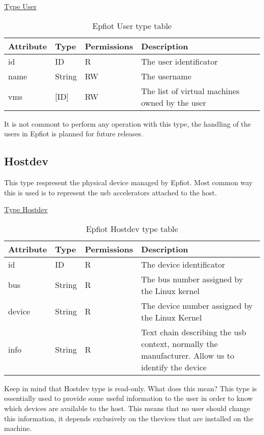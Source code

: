\underline{Type User}
\begin{table}[H]
\begin{center}
\begin{tabular}[b]{|l|l|l|l|}
    \hline
    Attribute & Type & Permissions & Description \\
    \hline
    id & ID & R & The user identificator \\
    name & String & RW & The username\\
    vms & [ID] & RW & The list of virtual machines owned by the user\\
    \hline
\end{tabular}
\caption{Epfiot User type table}
\label{table1}
\end{center}
\end{table}

It is not commont to perform any operation with this type, the handling of the users in Epfiot is planned for future releases.

\subsection{Hostdev}
\label{makereference5.1.2}

This type respresent the physical device managed by Epfiot. Most common way this is used is to represent the usb accelerators attached to the host.

\underline{Type Hostdev}
\begin{table}[H]
\begin{center}
\begin{tabular}[b]{|l|l|l|p{11cm}|}
    \hline
    Attribute & Type & Permissions & Description \\
    \hline
    id & ID & R & The device identificator \\
    \hline
    bus & String & R & The bus number assigned by the Linux kernel\\
    \hline
    device & String & R & The device number assigned by the Linux Kernel\\
    \hline
    info & String & R & Text chain describing the usb context, normally the manufacturer. Allow us to identify the device\\
    \hline
\end{tabular}
\caption{Epfiot Hostdev type table}
\label{table1}
\end{center}
\end{table}

Keep in mind that Hostdev type is read-only. What does this mean? This type is essentially used to provide some useful information to the user in order to know which devices are available to the host.
This means that no user should change this information, it depends exclusively on the thevices that are installed on the machine.


